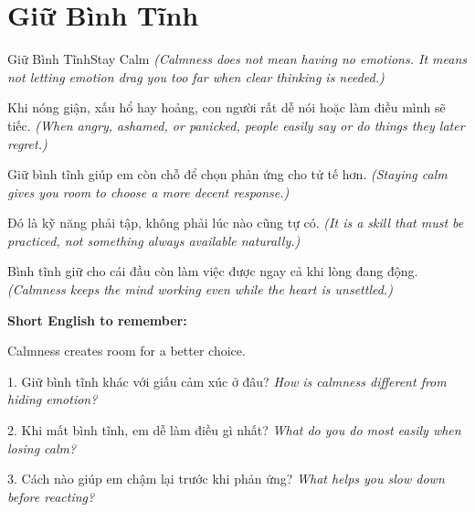 \section{Giữ Bình Tĩnh}
\begin{truyen}{Giữ Bình Tĩnh}{Stay Calm}
\textit{(Calmness does not mean having no emotions. It means not letting emotion drag you too far when clear thinking is needed.)}

Khi nóng giận, xấu hổ hay hoảng, con người rất dễ nói hoặc làm điều mình sẽ tiếc.
\textit{(When angry, ashamed, or panicked, people easily say or do things they later regret.)}

Giữ bình tĩnh giúp em còn chỗ để chọn phản ứng cho tử tế hơn.
\textit{(Staying calm gives you room to choose a more decent response.)}

Đó là kỹ năng phải tập, không phải lúc nào cũng tự có.
\textit{(It is a skill that must be practiced, not something always available naturally.)}
\end{truyen}

\begin{baihoc}
Bình tĩnh giữ cho cái đầu còn làm việc được ngay cả khi lòng đang động.
\textit{(Calmness keeps the mind working even while the heart is unsettled.)}
\end{baihoc}

\begin{ghinhoanh}
\textbf{Short English to remember:}

Calmness creates room for a better choice.

\end{ghinhoanh}

\begin{tuhocnhanh}
1. Giữ bình tĩnh khác với giấu cảm xúc ở đâu? \textit{How is calmness different from hiding emotion?}

2. Khi mất bình tĩnh, em dễ làm điều gì nhất? \textit{What do you do most easily when losing calm?}

3. Cách nào giúp em chậm lại trước khi phản ứng? \textit{What helps you slow down before reacting?}
\end{tuhocnhanh}
\ngancach

